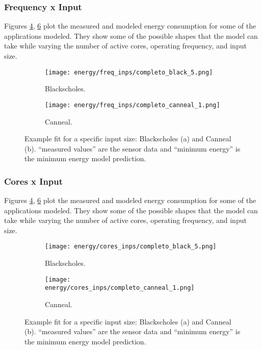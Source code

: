 \documentclass{ieeeaccess}
\begin{document}
\subsubsection{Frequency x Input}
Figures \ref{fig:en_eq_black}, \ref{fig:en_eq_canneal} plot the measured and modeled energy consumption for some of the applications modeled. They  show some of the possible shapes that the model can take while varying the number of active cores, operating frequency, and input size.
\begin{figure}[H]
    \centering
    \begin{subfigure}[b]{0.48\textwidth}
    	\centerline{\texttt{[image: energy/freq\_inps/completo\_black\_5.png]}}
        \caption{Blackscholes.}
    	\label{fig:en_eq_black}
    \end{subfigure}
    \begin{subfigure}[b]{0.48\textwidth}
	\centerline{\texttt{[image: energy/freq\_inps/completo\_canneal\_1.png]}}
    \caption{Canneal.}
	\label{fig:en_eq_canneal}
    \end{subfigure}
	\caption{Example fit for a specific input size: Blackscholes (a) and Canneal (b).  “measured values” are the sensor data and “minimum energy” is the minimum energy model prediction.
	}
\end{figure}
\subsubsection{Cores x Input}
Figures \ref{fig:en_eq_black}, \ref{fig:en_eq_canneal} plot the measured and modeled energy consumption for some of the applications modeled. They  show some of the possible shapes that the model can take while varying the number of active cores, operating frequency, and input size.
\begin{figure}[H]
    \centering
    \begin{subfigure}[b]{0.48\textwidth}
    	\centerline{\texttt{[image: energy/cores\_inps/completo\_black\_5.png]}}
        \caption{Blackscholes.}
    	\label{fig:en_eq_black}
    \end{subfigure}
    \begin{subfigure}[b]{0.48\textwidth}
	\centerline{\texttt{[image: energy/cores\_inps/completo\_canneal\_1.png]}}
    \caption{Canneal.}
	\label{fig:en_eq_canneal}
    \end{subfigure}
	\caption{Example fit for a specific input size: Blackscholes (a) and Canneal (b).  “measured values” are the sensor data and “minimum energy” is the minimum energy model prediction.
	}
\end{figure}
\end{document}

